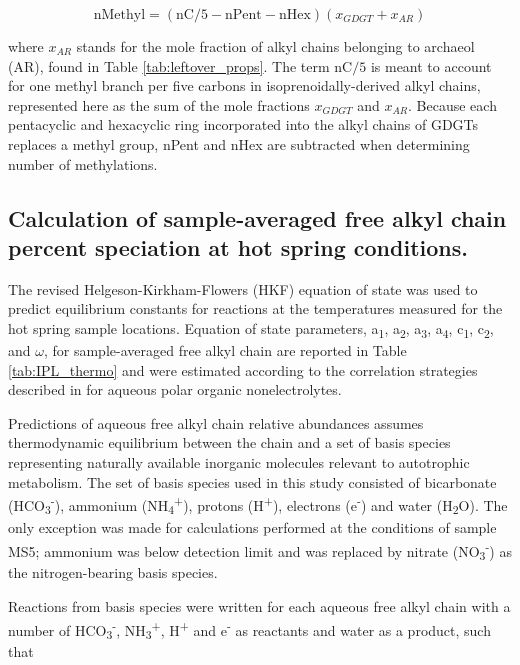 \begin{equation}
\text{nMethyl} = (\text{nC}/5 - \text{nPent} - \text{nHex})(x_{GDGT} + x_{AR})
\end{equation}

\noindent where $x_{AR}$ stands for the mole fraction of alkyl chains belonging to archaeol (AR), found in Table \ref{tab:leftover_props}. The term nC$/5$ is meant to account for one methyl branch per five carbons in isoprenoidally-derived alkyl chains, represented here as the sum of the mole fractions $x_{GDGT}$ and $x_{AR}$. Because each pentacyclic and hexacyclic ring incorporated into the alkyl chains of GDGTs replaces a methyl group, nPent and nHex are subtracted when determining number of methylations.


\subsection{Calculation of sample-averaged free alkyl chain percent speciation at hot spring conditions.} The revised Helgeson-Kirkham-Flowers (HKF) equation of state \citep{shock1992calculation} was used to predict equilibrium constants for reactions at the temperatures measured for the hot spring sample locations. Equation of state parameters, a\textsubscript{1}, a\textsubscript{2}, a\textsubscript{3}, a\textsubscript{4}, c\textsubscript{1}, c\textsubscript{2}, and $\omega$, for sample-averaged free alkyl chain are reported in Table \ref{tab:IPL_thermo} and were estimated according to the correlation strategies described in \cite{plyasunov2001correlation} for aqueous polar organic nonelectrolytes.

Predictions of aqueous free alkyl chain relative abundances assumes thermodynamic equilibrium between the chain and a set of basis species representing naturally available inorganic molecules relevant to autotrophic metabolism. The set of basis species used in this study consisted of bicarbonate (HCO\textsubscript{3}\textsuperscript{-}), ammonium (NH\textsubscript{4}\textsuperscript{+}), protons (H\textsuperscript{+}), electrons (e\textsuperscript{-}) and water (H\textsubscript{2}O). The only exception was made for calculations performed at the conditions of sample MS5; ammonium was below detection limit and was replaced by nitrate (NO\textsubscript{3}\textsuperscript{-}) as the nitrogen-bearing basis species.

Reactions from basis species were written for each aqueous free alkyl chain with a number of HCO\textsubscript{3}\textsuperscript{-}, NH\textsubscript{3}\textsuperscript{+}, H\textsuperscript{+} and e\textsuperscript{-} as reactants and water as a product, such that

